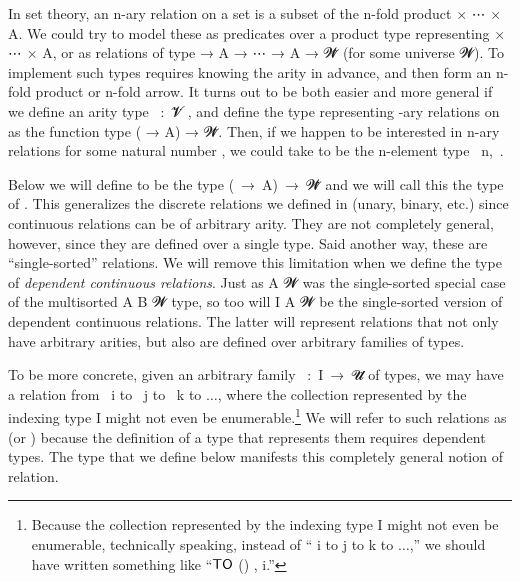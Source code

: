 In set theory, an \ab n-ary relation on a set  is a subset of the \ab n-fold product  \ad × \as ⋯ \ad × \ab A. We could try to model these as predicates over a product type representing  \ad × \as ⋯ \ad × \ab A, or as relations of type  \as → \ab A \as → \as ⋯ \as → \ab A \as → \ab 𝓦\af ̇ (for some universe \ab 𝓦). To implement such types requires knowing the arity in advance, and then form an \ab n-fold product or \ab n-fold arrow. It turns out to be both easier and more general if we define an arity type ~\as :~\ab 𝓥\af ̇ , and define the type representing -ary relations on  as the function type ( \as → \ab A) \as → \ab 𝓦\af ̇. Then, if we happen to be interested in \ab n-ary relations for some natural number , we could take  to be the \ab n-element type ~\ab n,~\cite{agda-fin}.

Below we will define  to be the type (~\as →~\ab A)~\as →~\ab 𝓦\af ̇ and we will call this the type of . This generalizes the discrete relations we defined in  (unary, binary, etc.) since continuous relations can be of arbitrary arity.  They are not completely general, however, since they are defined over a single type. Said another way, these are ``single-sorted'' relations. We will remove this limitation when we define the type of \emph{dependent continuous relations}. Just as  \ab A \ab 𝓦 was the single-sorted special case of the multisorted  \ab A \ab B \ab 𝓦 type, so too will  \ab I \ab A \ab 𝓦 be the single-sorted version of dependent continuous relations. The latter will represent relations that not only have arbitrary arities, but also are defined over arbitrary families of types.

To be more concrete, given an arbitrary family ~\as :~\ab I~\as →~\ab 𝓤\af ̇ of types, we may have a relation from ~\ab i to ~\ab j to ~\ab k to $\ldots$, where the collection represented by the indexing type \ab I might not even be enumerable.\footnote{\label{uncountable}Because the collection represented by the indexing type \ab I might not even be enumerable, technically speaking, instead of `` \ab i to  \ab j to  \ab k to $\ldots$,'' we should have written something like ``$\mathsf{\af{TO}}$ () ,  \ab i.''}
We will refer to such relations as  (or ) because the definition of a type that represents them requires dependent types. The  type that we define below manifests this completely general notion of relation.

